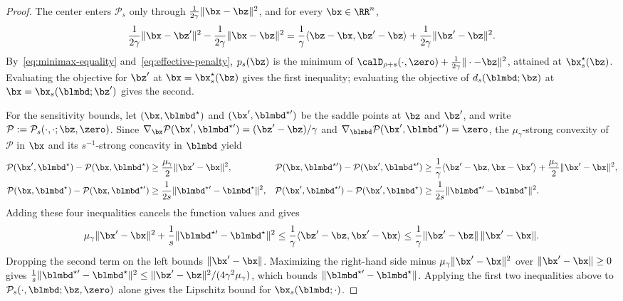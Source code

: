 \begin{proof}
The center enters \(\mathcal P_s\) only through
\(\frac{1}{2\gamma}\|\bx-\bz\|^2\), and for every \(\bx\in\RR^n\),
\[
    \frac{1}{2\gamma}\|\bx-\bz'\|^2-\frac{1}{2\gamma}\|\bx-\bz\|^2
    =\frac{1}{\gamma}\langle\bz-\bx,\bz'-\bz\rangle
    +\frac{1}{2\gamma}\|\bz'-\bz\|^2 .
\]
By~\eqref{eq:minimax-equality} and~\eqref{eq:effective-penalty}, \(p_s(\bz)\)
is the minimum of \(\calD_{\rho+s}(\cdot,\zero)+\frac{1}{2\gamma}\|\cdot-\bz\|^2\),
attained at \(\bx_s^\star(\bz)\). Evaluating the objective for \(\bz'\) at
\(\bx=\bx_s^\star(\bz)\) gives the first inequality; evaluating the objective of
\(d_s(\blmbd;\bz)\) at \(\bx=\bx_s(\blmbd;\bz')\) gives the second.

For the sensitivity bounds, let \((\bx,\blmbd^\star)\) and
\((\bx',\blmbd^{\star\prime})\) be the saddle points at \(\bz\) and \(\bz'\),
and write \(\mathcal P:=\mathcal P_s(\cdot,\cdot;\bz,\zero)\). Since
\(\nabla_{\bx}\mathcal P(\bx',\blmbd^{\star\prime})=(\bz'-\bz)/\gamma\) and
\(\nabla_{\blmbd}\mathcal P(\bx',\blmbd^{\star\prime})=\zero\), the
\(\mu_\gamma\)-strong convexity of \(\mathcal P\) in \(\bx\) and its
\(s^{-1}\)-strong concavity in \(\blmbd\) yield
\[
\begin{aligned}
    \mathcal P(\bx',\blmbd^\star)-\mathcal P(\bx,\blmbd^\star)
    &\ge\frac{\mu_\gamma}{2}\|\bx'-\bx\|^2,&
    \mathcal P(\bx,\blmbd^{\star\prime})-\mathcal P(\bx',\blmbd^{\star\prime})
    &\ge\frac{1}{\gamma}\langle\bz'-\bz,\bx-\bx'\rangle
    +\frac{\mu_\gamma}{2}\|\bx'-\bx\|^2,\\
    \mathcal P(\bx,\blmbd^\star)-\mathcal P(\bx,\blmbd^{\star\prime})
    &\ge\frac{1}{2s}\|\blmbd^{\star\prime}-\blmbd^\star\|^2,&
    \mathcal P(\bx',\blmbd^{\star\prime})-\mathcal P(\bx',\blmbd^\star)
    &\ge\frac{1}{2s}\|\blmbd^{\star\prime}-\blmbd^\star\|^2 .
\end{aligned}
\]
Adding these four inequalities cancels the function values and gives
\[
    \mu_\gamma\|\bx'-\bx\|^2+\frac1s\|\blmbd^{\star\prime}-\blmbd^\star\|^2
    \le\frac1\gamma\langle\bz'-\bz,\bx'-\bx\rangle
    \le\frac1\gamma\|\bz'-\bz\|\,\|\bx'-\bx\| .
\]
Dropping the second term on the left bounds \(\|\bx'-\bx\|\). Maximizing the
right-hand side minus \(\mu_\gamma\|\bx'-\bx\|^2\) over \(\|\bx'-\bx\|\ge0\)
gives \(\frac1s\|\blmbd^{\star\prime}-\blmbd^\star\|^2
\le\|\bz'-\bz\|^2/(4\gamma^2\mu_\gamma)\), which bounds
\(\|\blmbd^{\star\prime}-\blmbd^\star\|\). Applying the first two inequalities
above to \(\mathcal P_s(\cdot,\blmbd;\bz,\zero)\) alone gives the Lipschitz
bound for \(\bx_s(\blmbd;\cdot)\).
\end{proof}


